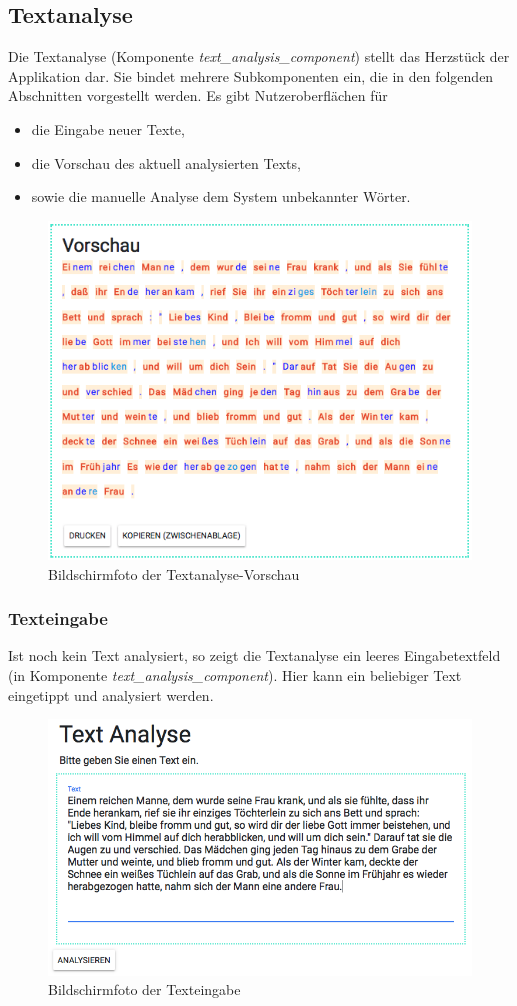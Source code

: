 \subsection{Textanalyse}

Die Textanalyse (Komponente \textit{text\_analysis\_component}) stellt das Herzstück der Applikation dar. Sie bindet mehrere Subkomponenten ein, die in den folgenden Abschnitten vorgestellt werden. Es gibt Nutzeroberflächen für
\begin{itemize}
	\item die Eingabe neuer Texte,
	\item die Vorschau des aktuell analysierten Texts,
	\item sowie die manuelle Analyse dem System unbekannter Wörter.
\end{itemize}

\begin{figure}[h!]
	\centering
	\includegraphics[width=.5\linewidth]{figures/frontend/textvorschau}
	\caption{Bildschirmfoto der Textanalyse-Vorschau}
	\label{fig:frontend-textanalyse}
\end{figure}

\subsubsection{Texteingabe}

Ist noch kein Text analysiert, so zeigt die Textanalyse ein leeres Eingabetextfeld (in Komponente \textit{text\_analysis\_component}). Hier kann ein beliebiger Text eingetippt und analysiert werden.

\begin{figure}[h!]
	\centering
	\includegraphics[width=.6\linewidth, frame]{figures/frontend/texteingabe}
	\caption{Bildschirmfoto der Texteingabe}
	\label{fig:frontend-texteingabe}
\end{figure}

